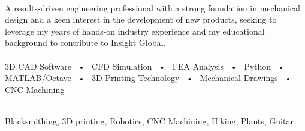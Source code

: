 \documentclass[allblack]{simplehipstercv}
\begin{document}
\begin{paracol}{2}


\paracolbackgroundoptions


\footnotesize
{\setasidefontcolour
\flushleft

\\[0.5em]

{\footnotesize
A results-driven engineering
professional with a strong
foundation in mechanical design
and a keen interest in the
development of new products,
seeking to leverage my years of
hands-on industry experience and
my educational background to
contribute to Insight Global.}\\
\bigskip
{} \\[0.5em]

3D CAD Software ~•~ CFD Simulation ~•~ FEA Analysis ~•~ Python ~•~ MATLAB/Octave ~•~ 3D Printing Technology ~•~ Mechanical Drawings ~•~ CNC Machining\\

\bigskip

\\[0.5em]

Blacksmithing, 3D printing, Robotics, CNC Machining,
Hiking, Plants, Guitar\\
\bigskip


\phantom{turn the page}
\phantom{turn the page}
}
\switchcolumn

\end{paracol}
\end{document}
